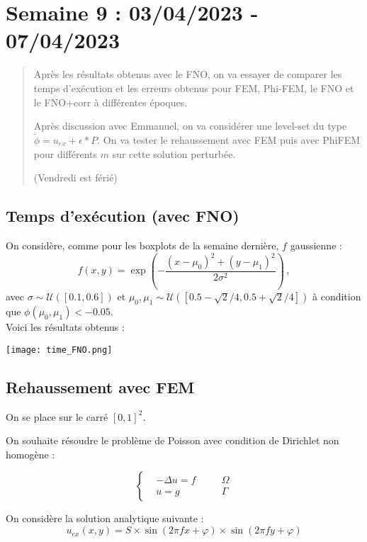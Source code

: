 \section{Semaine 9 : 03/04/2023 - 07/04/2023}
\graphicspath{{semaines/semaine_9/images/}}

\begin{abstract}
	Après les résultats obtenus avec le FNO, on va essayer de comparer les temps d'exécution et les erreurs obtenus pour FEM, Phi-FEM, le FNO et le FNO+corr à différentes époques.
	
	Après discussion avec Emmanuel, on va considérer une level-set du type $\tilde{\phi}=u_{ex}+\epsilon*P$. On va tester le rehaussement avec FEM puis avec PhiFEM pour différents $m$ sur cette solution perturbée.
	
	(Vendredi est férié)
\end{abstract}

\subsection{Temps d'exécution (avec FNO)}

On considère, comme pour les boxplots de la semaine dernière, $f$ gaussienne :
$$f(x,y) = \exp\left(-\frac{(x-\mu_0)^2 + (y-\mu_1)^2}{2\sigma^2}\right)\,, $$ 
avec $\sigma \sim \mathcal{U}([0.1,0.6])$ et $\mu_0, \mu_1 \sim \mathcal{U}([0.5-\sqrt{2}/4, 0.5+\sqrt{2}/4])$ à condition que $\phi(\mu_0, \mu_1) < -0.05$. \\

Voici les résultats obtenus :

\begin{minipage}{\linewidth}
	\centering
	\texttt{[image: time\_FNO.png]}
\end{minipage}

\subsection{Rehaussement avec FEM}

On se place sur le carré $[0,1]^2$. 

On souhaite résoudre le problème de Poisson avec condition de Dirichlet non homogène :

$$\left\{\begin{aligned}
	&-\Delta u=f \quad &&\Omega \\
	&u=g \quad &&\Gamma
\end{aligned}\right.$$

On considère la solution analytique suivante :
$$u_{ex}(x,y) = S\times\sin(2\pi fx + \varphi)\times\sin(2\pi fy + \varphi)$$ 


